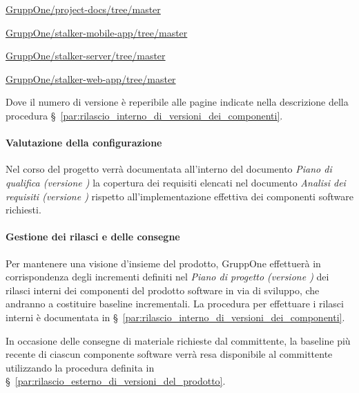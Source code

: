 \documentclass[../../norme-di-progetto.tex]{subfiles}
\begin{document}
\begin{description}
  \item \href{https://github.com/GruppOne/project-docs/tree/master}{GruppOne/project-docs/tree/master}
  \item \href{https://github.com/GruppOne/stalker-mobile-app/tree/master}{GruppOne/stalker-mobile-app/tree/master}
  \item \href{https://github.com/GruppOne/stalker-server/tree/master}{GruppOne/stalker-server/tree/master}
  \item \href{https://github.com/GruppOne/stalker-web-app/tree/master}{GruppOne/stalker-web-app/tree/master}
\end{description}

Dove il numero di versione è reperibile alle pagine indicate nella descrizione della procedura §~\ref{par:rilascio_interno_di_versioni_dei_componenti}.


\paragraph{Valutazione della configurazione}%
\label{par:valutazione_della_configurazione}

Nel corso del progetto verrà documentata all'interno del documento \textit{Piano di qualifica (versione \versione)} la copertura dei requisiti elencati nel documento \textit{Analisi dei requisiti (versione \versione)} rispetto all'implementazione effettiva dei componenti software richiesti.


\paragraph{Gestione dei rilasci e delle consegne}%
\label{par:gestione_dei_rilasci_e_delle_consegne}

Per mantenere una visione d'insieme del prodotto, GruppOne effettuerà in corrispondenza degli incrementi definiti nel \textit{Piano di progetto (versione \versione)} dei rilasci interni dei componenti del prodotto software in via di sviluppo, che andranno a costituire baseline incrementali. La procedura per effettuare i rilasci interni è documentata in §~\ref{par:rilascio_interno_di_versioni_dei_componenti}.

In occasione delle consegne di materiale richieste dal committente, la baseline più recente di ciascun componente software verrà resa disponibile al committente utilizzando la procedura definita in §~\ref{par:rilascio_esterno_di_versioni_del_prodotto}.
\end{document}

